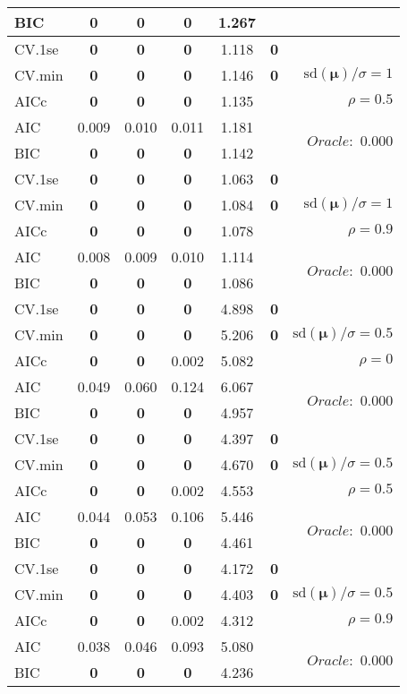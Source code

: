 \begin{table}
\begin{center}
\begin{tabular}{l*{5}{c}|r}
BIC & {\bf 0} & {\bf 0} & {\bf 0} & 1.267 & &  \\
 \hline 
CV.1se & {\bf 0} & {\bf 0} & {\bf 0} & 1.118 & {\bf 0} & \\
CV.min & {\bf 0} & {\bf 0} & {\bf 0} & 1.146 & {\bf 0} &  $\mathrm{sd}(\mathbf{\mu})/\sigma=1$ \\
AICc & {\bf 0} & {\bf 0} & {\bf 0} & 1.135 & & $\rho=0.5$ \\
AIC & 0.009 & 0.010 & 0.011 & 1.181 & &  \multirow{2}{*}{$Oracle: $ 0.000} \\
BIC & {\bf 0} & {\bf 0} & {\bf 0} & 1.142 & &  \\
 \hline 
CV.1se & {\bf 0} & {\bf 0} & {\bf 0} & 1.063 & {\bf 0} & \\
CV.min & {\bf 0} & {\bf 0} & {\bf 0} & 1.084 & {\bf 0} &  $\mathrm{sd}(\mathbf{\mu})/\sigma=1$ \\
AICc & {\bf 0} & {\bf 0} & {\bf 0} & 1.078 & & $\rho=0.9$ \\
AIC & 0.008 & 0.009 & 0.010 & 1.114 & &  \multirow{2}{*}{$Oracle: $ 0.000} \\
BIC & {\bf 0} & {\bf 0} & {\bf 0} & 1.086 & &  \\
 \hline 
CV.1se & {\bf 0} & {\bf 0} & {\bf 0} & 4.898 & {\bf 0} & \\
CV.min & {\bf 0} & {\bf 0} & {\bf 0} & 5.206 & {\bf 0} &  $\mathrm{sd}(\mathbf{\mu})/\sigma=0.5$ \\
AICc & {\bf 0} & {\bf 0} & 0.002 & 5.082 & & $\rho=0$ \\
AIC & 0.049 & 0.060 & 0.124 & 6.067 & &  \multirow{2}{*}{$Oracle: $ 0.000} \\
BIC & {\bf 0} & {\bf 0} & {\bf 0} & 4.957 & &  \\
 \hline 
CV.1se & {\bf 0} & {\bf 0} & {\bf 0} & 4.397 & {\bf 0} & \\
CV.min & {\bf 0} & {\bf 0} & {\bf 0} & 4.670 & {\bf 0} &  $\mathrm{sd}(\mathbf{\mu})/\sigma=0.5$ \\
AICc & {\bf 0} & {\bf 0} & 0.002 & 4.553 & & $\rho=0.5$ \\
AIC & 0.044 & 0.053 & 0.106 & 5.446 & &  \multirow{2}{*}{$Oracle: $ 0.000} \\
BIC & {\bf 0} & {\bf 0} & {\bf 0} & 4.461 & &  \\
 \hline 
CV.1se & {\bf 0} & {\bf 0} & {\bf 0} & 4.172 & {\bf 0} & \\
CV.min & {\bf 0} & {\bf 0} & {\bf 0} & 4.403 & {\bf 0} &  $\mathrm{sd}(\mathbf{\mu})/\sigma=0.5$ \\
AICc & {\bf 0} & {\bf 0} & 0.002 & 4.312 & & $\rho=0.9$ \\
AIC & 0.038 & 0.046 & 0.093 & 5.080 & &  \multirow{2}{*}{$Oracle: $ 0.000} \\
BIC & {\bf 0} & {\bf 0} & {\bf 0} & 4.236 & &  \\
 \hline 
\end{tabular}
\end{center}
\vspace{-1cm}
\end{table}




